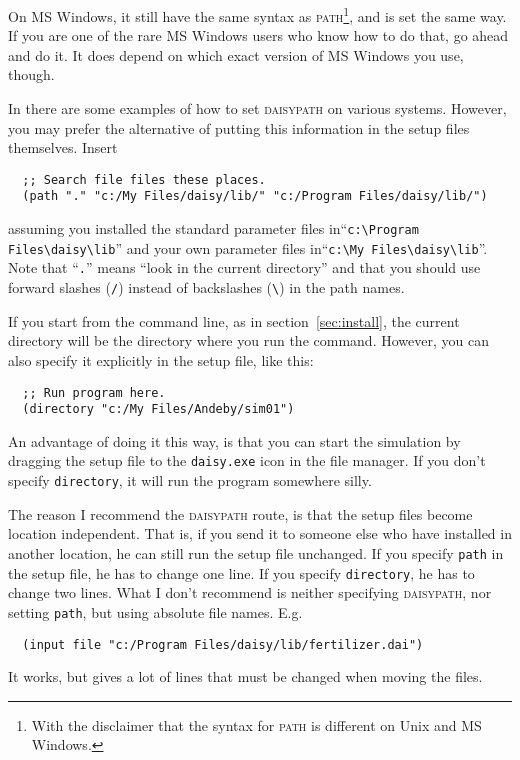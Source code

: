 \documentclass[a4paper,11pt]{article}
\begin{document}
On MS Windows, it still have the same syntax as
\textsc{path}\footnote{With the disclaimer that the syntax for
  \textsc{path} is different on Unix and MS Windows.}, and is set the
same way.  If you are one of the rare MS Windows users who know how to
do that, go ahead and do it.  It does depend on which exact version of
MS Windows you use, though.  

In \cite{dina81} there are some examples of how to set
\textsc{daisypath} on various systems.  However, you may prefer the
alternative of putting this information in the setup files themselves.
Insert
\begin{verbatim}
  ;; Search file files these places.
  (path "." "c:/My Files/daisy/lib/" "c:/Program Files/daisy/lib/")
\end{verbatim}
assuming you installed the \daisy{} standard parameter files
in\linebreak[4] ``\verb|c:\Program Files\daisy\lib|'' and your own
parameter files in\linebreak[4] ``\verb|c:\My Files\daisy\lib|''.
Note that ``\texttt{.}'' means ``look in the current directory'' and
that you should use forward slashes (\verb|/|) instead of backslashes
(\verb|\|) in the path names.

If you start \daisy{} from the command line, as in
section~\ref{sec:install}, the current directory will be the directory
where you run the command.  However, you can also specify it
explicitly in the setup file, like this:
\begin{verbatim}
  ;; Run program here.
  (directory "c:/My Files/Andeby/sim01")
\end{verbatim}
An advantage of doing it this way, is that you can start the simulation
by dragging the setup file to the \texttt{daisy.exe} icon in the file
manager.  If you don't specify \texttt{directory}, it will run the
program somewhere silly.

The reason I recommend the \textsc{daisypath} route, is that the setup
files become location independent.  That is, if you send it to someone
else who have installed \daisy{} in another location, he can still run
the setup file unchanged.  If you specify \texttt{path} in the setup
file, he has to change one line.  If you specify \texttt{directory},
he has to change two lines.  What I don't recommend is neither
specifying \textsc{daisypath}, nor setting \texttt{path}, but using
absolute file names.  E.g.
\begin{verbatim}
  (input file "c:/Program Files/daisy/lib/fertilizer.dai")
\end{verbatim}
It works, but gives a lot of lines that must be changed when moving
the files.
\end{document}

